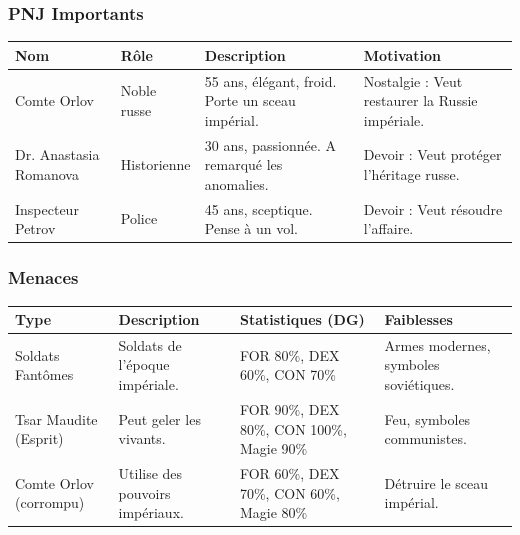 \documentclass[10pt,a5paper,twoside]{book}
\begin{document}
\newpage

\subsubsection*{PNJ Importants}
\begin{center}
	\begin{tabular}{|P{2cm}|P{3cm}|P{3.5cm}|P{2.5cm}|}
	\hline
	\textbf{Nom} 			& \textbf{Rôle} 	& \textbf{Description} 								& \textbf{Motivation} \\ \hline
	Comte Orlov 			& Noble russe 		& 55 ans, élégant, froid. Porte un sceau impérial.	& Nostalgie : Veut restaurer la Russie impériale. \\ \hline
	Dr. Anastasia Romanova 	& Historienne 		& 30 ans, passionnée. A remarqué les anomalies. 	& Devoir : Veut protéger l'héritage russe. \\ \hline
	Inspecteur Petrov 		& Police 			& 45 ans, sceptique. Pense à un vol. 				& Devoir : Veut résoudre l'affaire. \\ \hline
	\end{tabular}
\end{center}

\subsubsection*{Menaces}
\begin{center}
	\begin{tabular}{|P{2cm}|P{3cm}|P{3.5cm}|P{2.5cm}|}
	\hline
	\textbf{Type} 			& \textbf{Description} 				& \textbf{Statistiques (DG)} 				& \textbf{Faiblesses} \\ \hline
	Soldats Fantômes 		& Soldats de l'époque impériale. 	& FOR 80\%, DEX 60\%, CON 70\% 				& Armes modernes, symboles soviétiques. \\ \hline
	Tsar Maudite (Esprit) 	& Peut geler les vivants. 			& FOR 90\%, DEX 80\%, CON 100\%, Magie 90\% & Feu, symboles communistes. \\ \hline
	Comte Orlov (corrompu) 	& Utilise des pouvoirs impériaux. 	& FOR 60\%, DEX 70\%, CON 60\%, Magie 80\% 	& Détruire le sceau impérial. \\ \hline
	\end{tabular}
\end{center}

\newpage
\end{document}
